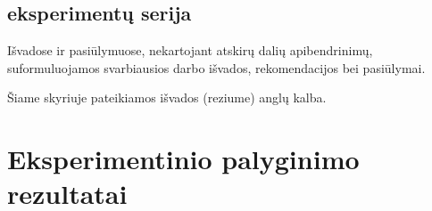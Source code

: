 \documentclass{VUMIFInfBakalaurinis}
\begin{document}
\subsection{ eksperimentų serija}

Išvadose ir pasiūlymuose, nekartojant atskirų dalių apibendrinimų,
suformuluojamos svarbiausios darbo išvados, rekomendacijos bei pasiūlymai.

Šiame skyriuje pateikiamos išvados (reziume) anglų kalba.

\printbibliography[heading=bibintoc]

\appendix  %


\section{Eksperimentinio palyginimo rezultatai}
\end{document}
